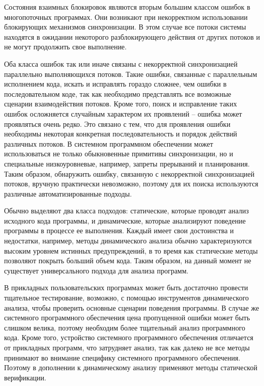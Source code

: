  
Состояния взаимных блокировок являются вторым большим классом ошибок в многопоточных программах.
Они возникают при некорректном использовании блокирующих механизмов синхронизации.
В этом случае все потоки системы находятся в ожидании некоторого разблокирующего действия от других потоков и не могут продолжить свое выполнение. 

Оба класса ошибок так или иначе связаны с некорректной синхронизацией параллельно выполняющихся потоков.
Такие ошибки, связанные с параллельным исполнением кода, искать и исправлять гораздо сложнее, чем ошибки в последовательном коде, так как необходимо представлять все возможные сценарии взаимодействия потоков.
Кроме того, поиск и исправление таких ошибок осложняется случайным характером их проявлений -- ошибка может проявляться очень редко.
Это связано с тем, что для проявления ошибки необходимы некоторая конкретная последовательность и порядок действий различных потоков. 
В системном программном обеспечении может использоваться не только обыкновенные примитивы синхронизации, но и специальные низкоуровневые, например, запреты прерываний и планирования. 
Таким образом, обнаружить ошибку, связанную с некорректной синхронизацией потоков, вручную практически невозможно, поэтому для их поиска используются различные автоматизированные подходы.

Обычно выделяют два класса подходов: статические, которые проводят анализ исходного кода программы, и динамические, которые анализируют поведение программы в процессе ее выполнения.
Каждый имеет свои достоинства и недостатки, например, методы динамического анализа обычно характеризуются высоким уровнем истинных предупреждений, в то время как статические методы позволяют покрыть больший объем кода.
Таким образом, на данный момент не существует универсального подхода для анализа программ.

В прикладных пользовательских программах может быть достаточно провести тщательное тестирование, возможно, с помощью инструментов динамического анализа, чтобы проверить основные сценарии поведения программы.
В случае же системного программного обеспечения цена пропущенной ошибки может быть слишком велика, поэтому необходим более тщательный анализ программного кода.
Кроме того, устройство системного программного обеспечения отличается от прикладных программ, что затрудняет анализ, так как далеко не все методы принимают во внимание специфику системного программного обеспечения.
Поэтому в дополнении к динамическому анализу применяют методы статической верификации.

